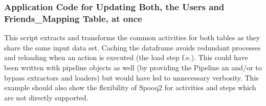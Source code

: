 \documentclass[a4paper,10pt, twoside,english]{sphinxmanual}
\begin{document}
\subsubsection{Application Code for Updating Both, the Users and Friends\_Mapping Table, at once}
\label{\detokenize{examples:application-code-for-updating-both-the-users-and-friends-mapping-table-at-once}}
This script extracts and transforms the common activities for both tables as they share the same input data set.
Caching the dataframe avoids redundant processes and reloading when an action is executed (the load step f.e.).
This could have been written with pipeline objects as well (by providing the Pipeline an  and/or  to bypass
extractors and loaders) but would have led to unnecessary verbosity. This example should also show the flexibility of
Spooq2 for activities and steps which are not directly supported.
\end{document}
